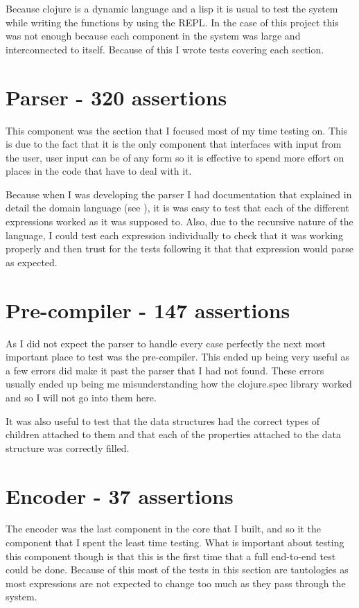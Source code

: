 Because clojure is a dynamic language and a lisp it is usual to test the system
while writing the functions by using the REPL. In the case of this project this
was not enough because each component in the system was large and interconnected
to itself. Because of this I wrote tests covering each section.

\section{Parser - 320 assertions}
\label{section:parser-testing}
This component was the section that I focused most of my time testing on. This
is due to the fact that it is the only component that interfaces with input from
the user, user input can be of any form so it is effective to spend more effort
on places in the code that have to deal with it.

Because when I was developing the parser I had documentation that explained in
detail the domain language (see \cite{Ilghami2006}), it is was easy to test that
each of the different expressions worked as it was supposed to. Also, due to the
recursive nature of the language, I could test each expression individually to
check that it was working properly and then trust for the tests following it
that that expression would parse as expected.


\section{Pre-compiler - 147 assertions}
\label{section:pre-compiler-testing}
As I did not expect the parser to handle every case perfectly the next most
important place to test was the pre-compiler. This ended up being very useful as
a few errors did make it past the parser that I had not found. These errors
usually ended up being me misunderstanding how the clojure.spec library worked
and so I will not go into them here.

It was also useful to test that the data structures had the correct types of
children attached to them and that each of the properties attached to the data
structure was correctly filled.

\section{Encoder - 37 assertions}
\label{section:encoder-testing}
The encoder was the last component in the core that I built, and so it the
component that I spent the least time testing. What is important about testing
this component though is that this is the first time that a full end-to-end test
could be done. Because of this most of the tests in this section are tautologies
as most expressions are not expected to change too much as they pass through the
system.

